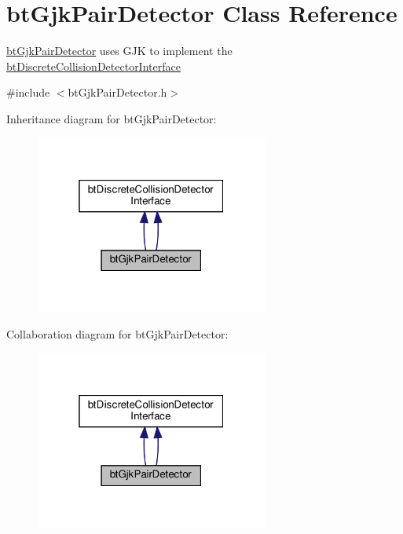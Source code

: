\hypertarget{classbtGjkPairDetector}{}\section{bt\+Gjk\+Pair\+Detector Class Reference}
\label{classbtGjkPairDetector}


\hyperlink{classbtGjkPairDetector}{bt\+Gjk\+Pair\+Detector} uses G\+JK to implement the \hyperlink{structbtDiscreteCollisionDetectorInterface}{bt\+Discrete\+Collision\+Detector\+Interface}  




{\ttfamily \#include $<$bt\+Gjk\+Pair\+Detector.\+h$>$}



Inheritance diagram for bt\+Gjk\+Pair\+Detector\+:
\nopagebreak
\begin{figure}[H]
\begin{center}
\leavevmode
\includegraphics[width=217pt]{classbtGjkPairDetector__inherit__graph}
\end{center}
\end{figure}


Collaboration diagram for bt\+Gjk\+Pair\+Detector\+:
\nopagebreak
\begin{figure}[H]
\begin{center}
\leavevmode
\includegraphics[width=217pt]{classbtGjkPairDetector__coll__graph}
\end{center}
\end{figure}
